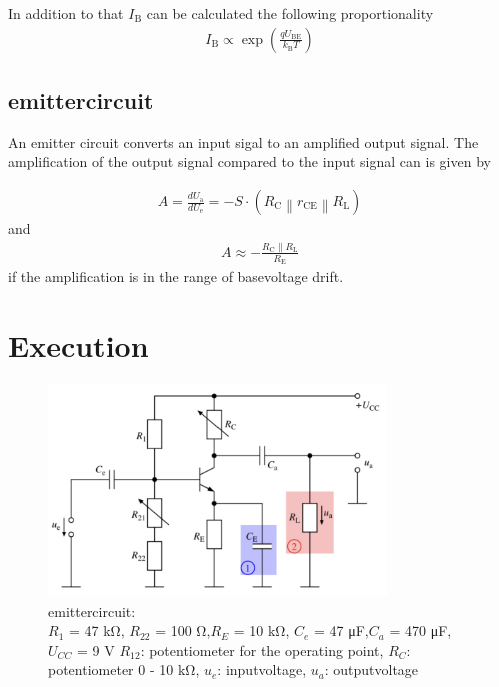 \documentclass[11pt, a4paper]{article}
\begin{document}
In addition to that $I_{\mathrm{B}}$ can be calculated the following proportionality 
\begin{align}
    I_{\mathrm{B}} \propto \exp \left(\frac{q U_{\mathrm{BE}}}{k_{\mathrm{B}} T}\right)
    \label{eq:Ib_T}
\end{align}

\subsection{emittercircuit}
An emitter circuit converts an input sigal to an amplified output signal. The amplification of the output signal compared to the input signal can is given by


\begin{align}
    A=\frac{d U_{\mathrm{a}}}{d U_{\mathrm{e}}}=-S \cdot\left(R_{\mathrm{C}}\left\|r_{\mathrm{CE}}\right\| R_{\mathrm{L}}\right)
    \label{eq:ampEasy}
\end{align}
and 
\begin{align}
A \approx-\frac{R_{\mathrm{C}} \| R_{\mathrm{L}}}{R_{\mathrm{E}}}
\label{eq:ampDrift}
\end{align}
if the amplification is in the range of basevoltage drift.
\section{Execution}
\begin{figure}[h]
    \centering
    \includegraphics[width=0.8\textwidth]{bilder/Emitter circuit.png}
    \caption{emittercircuit:\\
    $R_1$ = 47 \si{\kilo\ohm}, $R_{22}$ = 100 \si{\ohm},$R_E$ = 10 \si{\kilo\ohm}, $C_e$ = 47 \si{\micro\farad},$C_a$ = 470 \si{\micro\farad}, $U_{CC}$ = 9 \si{\volt} 
    $R_{12}$: potentiometer for the operating point, $R_C$: potentiometer 0 - 10 \si{\kilo\ohm}, $u_e$: inputvoltage, $u_a$: outputvoltage
    }
    \label{im:Emcir}
\end{figure}
\end{document}
